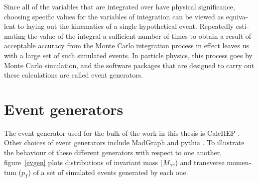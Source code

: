 \begin{english}
Since all of the variables that are integrated over have physical significance, choosing specific values for the variables of integration can be viewed as equivalent to laying out the kinematics of a single hypothetical event. Repeatedly estimating the value of the integral a sufficient number of times to obtain a result of acceptable accuracy from the Monte Carlo integration process in effect leaves us with a large set of such simulated events. In particle physics, this process goes by Monte Carlo simulation, and the software packages that are designed to carry out these calculations are called event generators.

\section{Event generators}

The event generator used for the bulk of the work in this thesis is CalcHEP \cite{calchep}. Other choices of event generators include MadGraph \cite{madgraph5} and pythia \cite{pythia}. To illustrate the behaviour of these different generators with respect to one another, figure~\ref{evgen} plots distributions of invariant mass ($M_{\gamma\gamma}$) and transverse momentum ($p_T$) of a set of simulated events generated by each one.

\begin{figure}[htp]
\begin{minipage}[b]{.69\textwidth}
\begin{infilsf} \tiny
\hspace{-1ex}\makebox[0pt][l]{}
\end{infilsf}
\end{minipage}
\begin{minipage}[b]{.3\textwidth}

\phantom{p}
\end{minipage}
\begin{minipage}[b]{.69\textwidth}
\begin{infilsf} \tiny
\hspace{-1ex}\makebox[0pt][l]{}
\end{infilsf}
\end{minipage}
\begin{minipage}[b]{.3\textwidth}


\end{minipage}
\end{figure}
\end{english}
